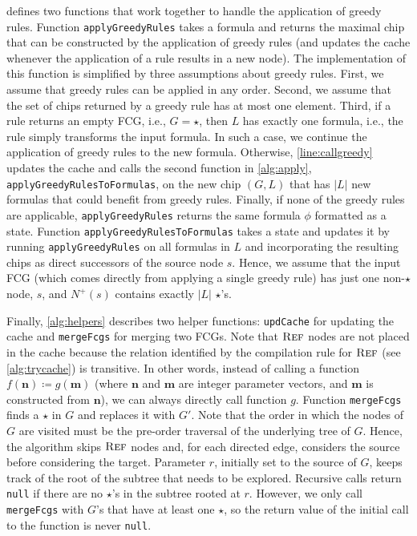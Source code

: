  defines two functions that work together to handle the
application of greedy rules. Function \texttt{applyGreedyRules} takes a formula
and returns the maximal chip that can be constructed by the application of
greedy rules (and updates the cache whenever the application of a rule results
in a new node). The implementation of this function is simplified by three
assumptions about greedy rules. First, we assume that greedy rules can be
applied in any order. Second, we assume that the set of chips returned by a
greedy rule has at most one element. Third, if a rule returns an empty FCG,
i.e., $G = \star$, then $L$ has exactly one formula, i.e., the rule simply
transforms the input formula. In such a case, we continue the application of
greedy rules to the new formula. Otherwise, \cref{line:callgreedy} updates the
cache and calls the second function in \cref{alg:apply},
\texttt{applyGreedyRulesToFormulas}, on the new chip $(G, L)$ that has $|L|$ new
formulas that could benefit from greedy rules. Finally, if none of the greedy
rules are applicable, \texttt{applyGreedyRules} returns the same formula $\phi$
formatted as a state. Function \texttt{applyGreedyRulesToFormulas} takes a state
and updates it by running \texttt{applyGreedyRules} on all formulas in $L$ and
incorporating the resulting chips as direct successors of the source node $s$.
Hence, we assume that the input FCG (which comes directly from applying a single
greedy rule) has just one non-$\star$ node, $s$, and $N^+(s)$ contains exactly
$|L|$ $\star$'s.


Finally, \cref{alg:helpers} describes two helper functions: \texttt{updCache}
for updating the cache and \texttt{mergeFcgs} for merging two FCGs. Note that
$\operatorname{\textsc{Ref}}$ nodes are not placed in the cache because the relation identified by the
compilation rule for $\operatorname{\textsc{Ref}}$ (see \cref{alg:trycache}) is transitive. In other
words, instead of calling a function $f(\mathbf{n}) \coloneqq g(\mathbf{m})$
(where $\mathbf{n}$ and $\mathbf{m}$ are integer parameter vectors, and
$\mathbf{m}$ is constructed from $\mathbf{n}$), we can always directly call
function $g$. Function \texttt{mergeFcgs} finds a $\star$ in $G$ and replaces it
with $G'$. Note that the order in which the nodes of $G$ are visited must be the
pre-order traversal of the underlying tree of $G$. Hence, the algorithm skips
$\operatorname{\textsc{Ref}}$ nodes and, for each directed edge, considers the source before
considering the target. Parameter $r$, initially set to the source of $G$, keeps
track of the root of the subtree that needs to be explored. Recursive calls
return \texttt{null} if there are no $\star$'s in the subtree rooted at $r$.
However, we only call \texttt{mergeFcgs} with $G$'s that have at least one
$\star$, so the return value of the initial call to the function is never
\texttt{null}.

